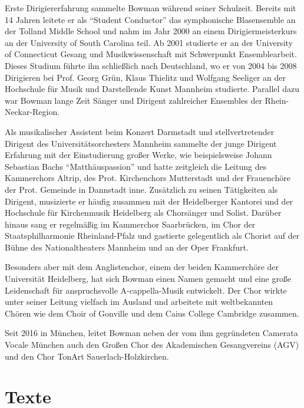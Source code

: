 \documentclass[11pt, ngermanm, titlepage]{article}
\begin{document}
\begin{multicols}{2}
	Erste Dirigiererfahrung sammelte Bowman während seiner Schulzeit. Bereits mit 14 Jahren leitete er als "`Student Conductor"' das symphonische Blasensemble an der Tolland Middle School und nahm im Jahr 2000 an einem Dirigiermeisterkurs an der University of South Carolina teil. Ab 2001 studierte er an der University of Connecticut Gesang und Musikwissenschaft mit Schwerpunkt Ensemblearbeit. Dieses Studium führte ihn schließlich nach Deutschland, wo er von 2004 bis 2008 Dirigieren bei Prof. Georg Grün, Klaus Thielitz und Wolfgang Seeliger an der Hochschule für Musik und Darstellende Kunst Mannheim studierte. Parallel dazu war Bowman lange Zeit Sänger und Dirigent zahlreicher Ensembles der Rhein-Neckar-Region.
	
	Als musikalischer Assistent beim Konzert Darmstadt und stellvertretender Dirigent des Universitätsorchesters Mannheim sammelte der junge Dirigent Erfahrung mit der Einstudierung großer Werke, wie beispielsweise Johann Sebastian Bachs "`Matthäuspassion"' und hatte zeitgleich die Leitung des Kammerchors Altrip, des Prot. Kirchenchors Mutterstadt und der Frauenchöre der Prot. Gemeinde in Dannstadt inne. Zusätzlich zu seinen Tätigkeiten als Dirigent, musizierte er häufig zusammen mit der Heidelberger Kantorei und der Hochschule für Kirchenmusik Heidelberg als Chorsänger und Solist. Darüber hinaus sang er regelmäßig im Kammerchor Saarbrücken, im Chor der Staatsphilharmonie Rheinland-Pfalz und gastierte gelegentlich als Chorist auf der Bühne des Nationaltheaters Mannheim und an der Oper Frankfurt.
	 
	Besonders aber mit dem Anglistenchor, einem der beiden Kammerchöre der Universität Heidelberg, hat sich Bowman einen Namen gemacht und eine große Leidenschaft für anspruchsvolle A-cappella-Musik entwickelt. Der Chor wirkte unter seiner Leitung vielfach im Ausland und arbeitete mit weltbekannten Chören wie dem Choir of Gonville und dem Caius College Cambridge zusammen.
	 
	Seit 2016 in München, leitet Bowman neben der vom ihm gegründeten Camerata Vocale München auch den Großen Chor des Akademischen Gesangvereins (AGV) und den Chor TonArt Sauerlach-Holzkirchen.
	\section*{Texte}
	\end{multicols}
\end{document}
